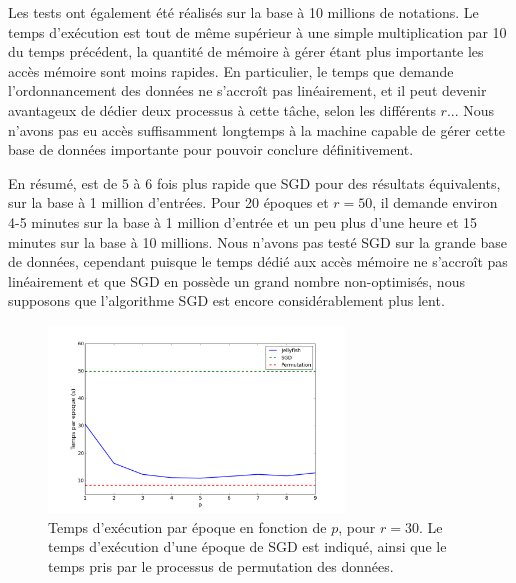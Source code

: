 \documentclass[10pt,a4paper]{article}
\begin{document}
Les tests ont également été réalisés sur la base à 10 millions de notations. Le temps d'exécution est tout de même supérieur à une simple multiplication par 10 du temps précédent, la quantité de mémoire à gérer étant plus importante les accès mémoire sont moins rapides. En particulier, le temps que demande l'ordonnancement des données ne s'accroît pas linéairement, et il peut devenir avantageux de dédier deux processus à cette tâche, selon les différents $r$... Nous n'avons pas eu accès suffisamment longtemps à la machine capable de gérer cette base de données importante pour pouvoir conclure définitivement.

En résumé, \jel est de $5$ à $6$ fois plus rapide que SGD pour des résultats équivalents, sur la base à 1 million d'entrées. Pour 20 époques et $r=50$, il demande environ 4-5 minutes sur la base à 1 million d'entrée et un peu plus d'une heure et 15 minutes sur la base à 10 millions. Nous n'avons pas testé SGD sur la grande base de données, cependant puisque le temps dédié aux accès mémoire ne s'accroît pas linéairement et que SGD en possède un grand nombre non-optimisés, nous supposons que l'algorithme SGD est encore considérablement plus lent.

\begin{figure}
\centering
\includegraphics[width=0.7\textwidth]{fig/time_jel1}
\caption{Temps d'exécution par époque en fonction de $p$, pour $r=30$. Le temps d'exécution d'une époque de SGD est indiqué, ainsi que le temps pris par le processus de permutation des données.}
\label{time}
\end{figure}

\end{document}
